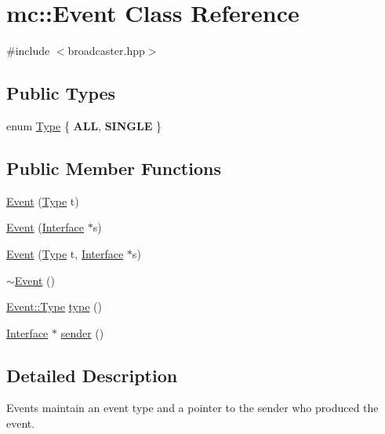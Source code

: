 \hypertarget{classmc_1_1Event}{}\section{mc\+:\+:Event Class Reference}
\label{classmc_1_1Event}


{\ttfamily \#include $<$broadcaster.\+hpp$>$}

\subsection*{Public Types}
\begin{DoxyCompactItemize}
\item 
enum \hyperlink{classmc_1_1Event_afe30211c7b3a7564272ed756e96c8717}{Type} \{ {\bfseries A\+LL}, 
{\bfseries S\+I\+N\+G\+LE}
 \}
\end{DoxyCompactItemize}
\subsection*{Public Member Functions}
\begin{DoxyCompactItemize}
\item 
\hyperlink{classmc_1_1Event_a1f2a094035fb1393bb3d7c9f3c6a604e}{Event} (\hyperlink{classmc_1_1Event_afe30211c7b3a7564272ed756e96c8717}{Type} t)
\item 
\hyperlink{classmc_1_1Event_a8ec8d92673d38611264a357d959beb08}{Event} (\hyperlink{classmc_1_1Interface}{Interface} $\ast$s)
\item 
\hyperlink{classmc_1_1Event_a14f5222905775d873f7da210b05907a4}{Event} (\hyperlink{classmc_1_1Event_afe30211c7b3a7564272ed756e96c8717}{Type} t, \hyperlink{classmc_1_1Interface}{Interface} $\ast$s)
\item 
\hyperlink{classmc_1_1Event_affe2c3084bf256be3c56789fdeb82567}{$\sim$\+Event} ()
\item 
\hyperlink{classmc_1_1Event_afe30211c7b3a7564272ed756e96c8717}{Event\+::\+Type} \hyperlink{classmc_1_1Event_ae95c0cc6d4609bb6c032c124caafbf4f}{type} ()
\item 
\hyperlink{classmc_1_1Interface}{Interface} $\ast$ \hyperlink{classmc_1_1Event_a05c4a8a5a5df79804315306dc1b6c257}{sender} ()
\end{DoxyCompactItemize}


\subsection{Detailed Description}
Events maintain an event type and a pointer to the sender who produced the event. 

